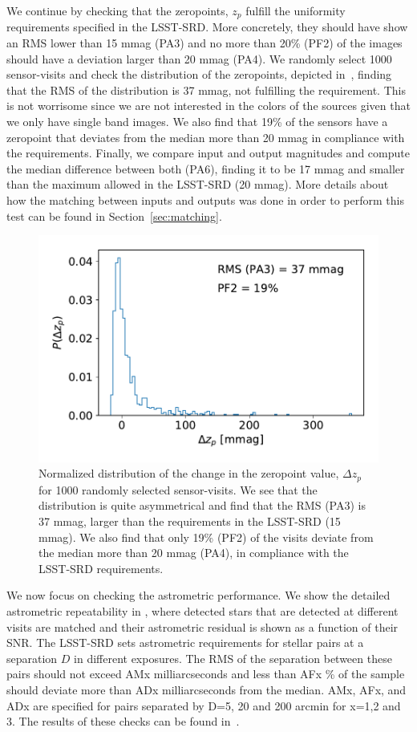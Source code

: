 \documentclass[twocolumn]{aastex62}
\begin{document}
We continue by checking that the zeropoints, $z_{p}$ fulfill the uniformity requirements specified in the LSST-SRD. More concretely, they should have show an RMS lower than 15 mmag (PA3) and no more than 20\% (PF2) of the images should have a deviation larger than 20 mmag (PA4). We randomly select 1000 sensor-visits and check the distribution of the zeropoints, depicted in~, finding that the RMS of the distribution is 37 mmag, not fulfilling the requirement. This is not worrisome since we are not interested in the colors of the sources given that we only have single band images. We also find that 19\% of the sensors have a zeropoint that deviates from the median more than 20 mmag in compliance with the requirements. Finally, we compare input and output magnitudes and compute the median difference between both (PA6), finding it to be 17 mmag and smaller than the maximum allowed in the LSST-SRD (20 mmag). More details about how the matching between inputs and outputs was done in order to perform this test can be found in Section~\ref{sec:matching}.

\begin{figure}
\centering
\includegraphics[width=0.9\columnwidth]{PA234.pdf}
\caption{Normalized distribution of the change in the zeropoint value, $\Delta z_{p}$ for 1000 randomly selected sensor-visits. We see that the distribution is quite asymmetrical and find that the RMS (PA3) is 37 mmag, larger than the requirements in the LSST-SRD (15 mmag). We also find that only 19\% (PF2) of the visits deviate from the median more than 20 mmag (PA4), in compliance with the LSST-SRD requirements.}
\label{fig:PA34}
\end{figure}

We now focus on checking the astrometric performance.  We show the detailed astrometric repeatability in , where detected stars that are detected at different visits are matched and their astrometric residual is shown as a function of their SNR. The LSST-SRD sets astrometric requirements for stellar pairs at a separation $D$ in different exposures. The RMS of the separation between these pairs should not exceed AMx milliarcseconds and less than AFx \% of the sample should deviate more than ADx milliarcseconds from the median. AMx, AFx, and ADx are specified for pairs separated by D=5, 20 and 200 arcmin for x=1,2 and 3. The results of these checks can be found in~.
\end{document}
